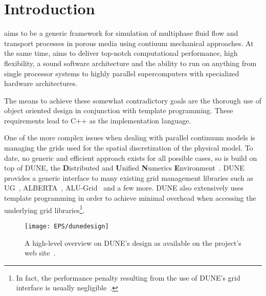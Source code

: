 \chapter{Introduction}

\Dumux aims to be a generic framework for simulation of multiphase
fluid flow and transport processes in porous media using contiuum
mechanical approaches.  At the same time, \Dumux aims to deliver
top-notch computational performance, high flexibility, a sound
software architecture and the ability to run on anything from single
processor systems to highly parallel supercomputers with specialized
hardware architectures.

The means to achieve these somewhat contradictory goals are the
thorough use of object oriented design in conjunction with template
programming. These requirements lead to C++ as the implementation
language.

One of the more complex issues when dealing with parallel continuum
models is managing the grids used for the spatial discretization of
the physical model. To date, no generic and efficient approach exists
for all possible cases, so \Dumux is build on top of DUNE, the
\textbf{D}istributed and \textbf{U}nified \textbf{N}umerics
\textbf{E}nvironment~\cite{DUNE-HP}. DUNE provides a generic interface
to many existing grid management libraries such as UG~\cite{UG-HP},
ALBERTA~\cite{ALBERTA-HP}, ALU-Grid~\cite{ALUGRID-HP} and a few
more. DUNE also extensively uses template programming in order to
achieve minimal overhead when accessing the underlying grid
libraries\footnote{In fact, the performance penalty resulting from the
  use of DUNE's grid interface is usually
  negligible~\cite{BURRI2006}.}.
\begin{figure}[hbt]
  \centering 
  \texttt{[image: EPS/dunedesign]}
  \caption{
    \label{fig:dune-design}
    A high-level overview on DUNE's design as available on the project's
    web site~\cite{DUNE-HP}.
  }
\end{figure}

